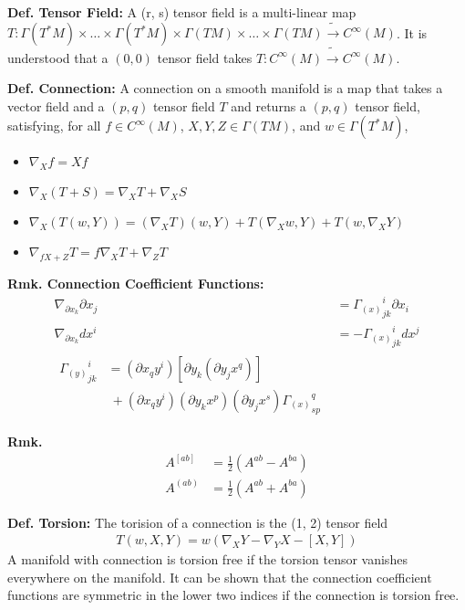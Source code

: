 \documentclass[12pt]{article}
\begin{document}
\begin{multicols}{2}
  \noindent
  \textbf{Def. Tensor Field:}
  A (r, s) tensor field is a multi-linear map $T: \Gamma(T^*M) \times \dots \times \Gamma(T^*M) \times \Gamma(TM) \times \dots \times \Gamma(TM) \tilde{\rightarrow} C^{\infty}(M)$. It is understood
  that a $(0, 0)$ tensor field takes $T: C^{\infty}(M) \tilde{\rightarrow} C^{\infty}(M)$.

  \noindent
  \textbf{Def. Connection:} A connection on a smooth manifold is a map that takes a vector field
  and a $(p, q)$ tensor field $T$ and returns a $(p, q)$ tensor field, satisfying, for all $f \in C^{\infty}(M)$,
  $X, Y, Z \in \Gamma(TM)$, and $w \in \Gamma(T^*M)$,
  \begin{itemize}
  \item $\nabla_X f = X f$ 
  \item $\nabla_X (T + S) = \nabla_X T + \nabla_X S$
  \item $\nabla_X (T(w, Y)) = (\nabla_X T)(w, Y) + T(\nabla_X w, Y) + T(w, \nabla_X Y)$
  \item $\nabla_{f X + Z} T = f \nabla_X T + \nabla_Z T$
  \end{itemize}

  \noindent
  \textbf{Rmk. Connection Coefficient Functions:}
  \begin{align}
  \nabla_{\partial x_k} \partial x_j &= {\Gamma_{(x)}}^i_{jk} \partial x_i\\
  \nabla_{\partial x_k} d x^i &= -{\Gamma_{(x)}}^i_{jk} dx^j\\
  \begin{split}
    {\Gamma_{(y)}}^i_{jk} &= (\partial x_q y^i) [\partial y_k (\partial y_j x^q)]\\
    & \ + (\partial x_q y^i) (\partial y_k x^p) (\partial y_j x^s) {\Gamma_{(x)}}^q_{sp}
  \end{split}
  \end{align}
  
  \noindent
  \textbf{Rmk.}
  \begin{align}
    A^{[ab]} &= \frac{1}{2}(A^{ab} - A^{ba})\\
    A^{(ab)} &= \frac{1}{2}(A^{ab} + A^{ba})
  \end{align}

  \noindent
  \textbf{Def. Torsion:}
  The torision of a connection is the (1, 2) tensor field
  \begin{align}
    T(w, X, Y) = w(\nabla_X Y - \nabla_Y X - [X, Y])
  \end{align}
  A manifold with connection is torsion free if the torsion tensor vanishes everywhere on the manifold.
  It can be shown that the connection coefficient functions are symmetric in the lower two indices
  if the connection is torsion free.


\end{multicols}
\end{document}
